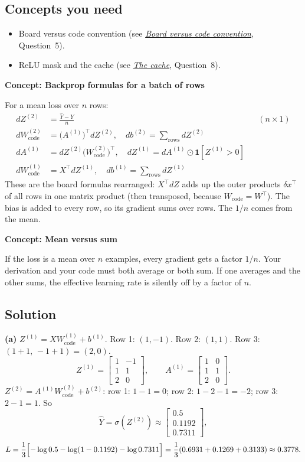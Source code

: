 \documentclass[12pt,a4paper]{article}
\newcommand{\concept}[2]{\par\medskip\phantomsection\label{#1}{\large\bfseries\color{blue!50!black} Concept: #2}\par}
\newcommand{\seeconcept}[3]{(see \hyperref[#1]{\textit{#2}}, Question~#3)}
\begin{document}
\subsection*{Concepts you need}
\begin{itemize}[nosep]
\item Board versus code convention \seeconcept{c:boardcode}{Board versus code convention}{5}.
\item ReLU mask and the cache \seeconcept{c:cache}{The cache}{8}.
\end{itemize}

\concept{c:batchbackprop}{Backprop formulas for a batch of rows}
For a mean loss over $n$ rows:
\begin{align*}
dZ^{(2)}&=\frac{\hat Y-Y}{n} &&(n\times1)\\
dW^{(2)}_{\text{code}}&=\bigl(A^{(1)}\bigr)^\top dZ^{(2)},\quad db^{(2)}=\textstyle\sum_{\text{rows}}dZ^{(2)}\\
dA^{(1)}&=dZ^{(2)}\bigl(W^{(2)}_{\text{code}}\bigr)^\top,\quad dZ^{(1)}=dA^{(1)}\odot\mathbf 1[Z^{(1)}>0]\\
dW^{(1)}_{\text{code}}&=X^\top dZ^{(1)},\quad db^{(1)}=\textstyle\sum_{\text{rows}}dZ^{(1)}
\end{align*}
These are the board formulas rearranged: $X^\top dZ$ adds up the outer products $\delta x^\top$ of all rows in one matrix product (then transposed, because $W_{\text{code}}=W^\top$). The bias is added to every row, so its gradient sums over rows. The $1/n$ comes from the mean.

\concept{c:meansum}{Mean versus sum}
If the loss is a mean over $n$ examples, every gradient gets a factor $1/n$. Your derivation and your code must both average or both sum. If one averages and the other sums, the effective learning rate is silently off by a factor of $n$.

\subsection*{Solution}
\textbf{(a)} $Z^{(1)}=XW^{(1)}_{\text{code}}+b^{(1)}$. Row 1: $(1,-1)$. Row 2: $(1,1)$. Row 3: $(1+1,\,-1+1)=(2,0)$.
\[
Z^{(1)}=\begin{bmatrix}1&-1\\1&1\\2&0\end{bmatrix},\qquad A^{(1)}=\begin{bmatrix}1&0\\1&1\\2&0\end{bmatrix}.
\]
$Z^{(2)}=A^{(1)}W^{(2)}_{\text{code}}+b^{(2)}$: row 1: $1-1=0$; row 2: $1-2-1=-2$; row 3: $2-1=1$. So
\[
\hat Y=\sigma(Z^{(2)})\approx\begin{bmatrix}0.5\\0.1192\\0.7311\end{bmatrix},
\]
\[
L=\frac13\Bigl[-\log0.5-\log(1-0.1192)-\log0.7311\Bigr]=\frac13(0.6931+0.1269+0.3133)\approx0.3778 .
\]
\end{document}
